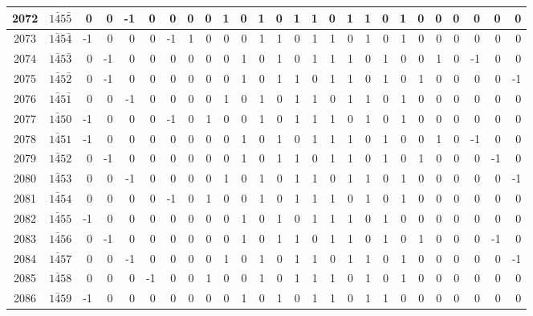 \documentclass[12 pt]{article}%
\begin{document}
\begin{tiny}
\begin{centering}
\begin{longtable}{|c|c||rrrrrrrrrrrrrrrrrrrrrrrr|}
      \hline
      2072 & $1\bar45\bar5$ & 0 & 0 & -1 & 0 & 0 & 0 & 0 & 1 & 0 & 1 & 0 & 1 & 1 & 0 & 1 & 1 & 0 & 1 & 0 & 0 & 0 & 0 & 0 & 0 \\
      \hline
      2073 & $1\bar45\bar4$ & -1 & 0 & 0 & 0 & -1 & 1 & 0 & 0 & 0 & 1 & 1 & 0 & 1 & 1 & 0 & 1 & 0 & 1 & 0 & 0 & 0 & 0 & 0 & 0 \\
      \hline
      2074 & $1\bar45\bar3$ & 0 & -1 & 0 & 0 & 0 & 0 & 0 & 0 & 1 & 0 & 1 & 0 & 1 & 1 & 1 & 0 & 1 & 0 & 0 & 1 & 0 & -1 & 0 & 0 \\
      \hline
      2075 & $1\bar45\bar2$ & 0 & -1 & 0 & 0 & 0 & 0 & 0 & 0 & 1 & 0 & 1 & 1 & 0 & 1 & 1 & 0 & 1 & 0 & 1 & 0 & 0 & 0 & 0 & -1 \\
      \hline
      2076 & $1\bar45\bar1$ & 0 & 0 & -1 & 0 & 0 & 0 & 0 & 1 & 0 & 1 & 0 & 1 & 1 & 0 & 1 & 1 & 0 & 1 & 0 & 0 & 0 & 0 & 0 & 0 \\
      \hline
      2077 & $1\bar450$ & -1 & 0 & 0 & 0 & -1 & 0 & 1 & 0 & 0 & 1 & 0 & 1 & 1 & 1 & 0 & 1 & 0 & 1 & 0 & 0 & 0 & 0 & 0 & 0 \\
      \hline
      2078 & $1\bar451$ & -1 & 0 & 0 & 0 & 0 & 0 & 0 & 0 & 1 & 0 & 1 & 0 & 1 & 1 & 1 & 0 & 1 & 0 & 0 & 1 & 0 & -1 & 0 & 0 \\
      \hline
      2079 & $1\bar452$ & 0 & -1 & 0 & 0 & 0 & 0 & 0 & 0 & 1 & 0 & 1 & 1 & 0 & 1 & 1 & 0 & 1 & 0 & 1 & 0 & 0 & 0 & -1 & 0 \\
      \hline
      2080 & $1\bar453$ & 0 & 0 & -1 & 0 & 0 & 0 & 0 & 1 & 0 & 1 & 0 & 1 & 1 & 0 & 1 & 1 & 0 & 1 & 0 & 0 & 0 & 0 & 0 & -1 \\
      \hline
      2081 & $1\bar454$ & 0 & 0 & 0 & 0 & -1 & 0 & 1 & 0 & 0 & 1 & 0 & 1 & 1 & 1 & 0 & 1 & 0 & 1 & 0 & 0 & 0 & 0 & 0 & 0 \\
      \hline
      2082 & $1\bar455$ & -1 & 0 & 0 & 0 & 0 & 0 & 0 & 0 & 1 & 0 & 1 & 0 & 1 & 1 & 1 & 0 & 1 & 0 & 0 & 0 & 0 & 0 & 0 & 0 \\
      \hline
      2083 & $1\bar456$ & 0 & -1 & 0 & 0 & 0 & 0 & 0 & 0 & 1 & 0 & 1 & 1 & 0 & 1 & 1 & 0 & 1 & 0 & 1 & 0 & 0 & 0 & -1 & 0 \\
      \hline
      2084 & $1\bar457$ & 0 & 0 & -1 & 0 & 0 & 0 & 0 & 1 & 0 & 1 & 0 & 1 & 1 & 0 & 1 & 1 & 0 & 1 & 0 & 0 & 0 & 0 & 0 & -1 \\
      \hline
      2085 & $1\bar458$ & 0 & 0 & 0 & -1 & 0 & 0 & 1 & 0 & 0 & 1 & 0 & 1 & 1 & 1 & 0 & 1 & 0 & 1 & 0 & 0 & 0 & 0 & 0 & 0 \\
      \hline
      2086 & $1\bar459$ & -1 & 0 & 0 & 0 & 0 & 0 & 0 & 0 & 1 & 0 & 1 & 0 & 1 & 1 & 0 & 1 & 1 & 0 & 0 & 0 & 0 & 0 & 0 & 0 \\

\end{longtable}
\end{centering}
\end{tiny}
\end{document}
